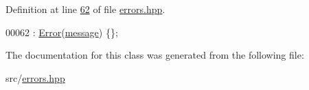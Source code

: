 Definition at line \hyperlink{errors_8hpp_source_l00062}{62} of file \hyperlink{errors_8hpp_source}{errors.\+hpp}.


\begin{DoxyCode}
00062 : \hyperlink{classError_accd611f3ddae0828adeb6ca251113ffd}{Error}(\hyperlink{classError_aa4713ef3ee9c3c0da43a54b01949510d}{message}) \{\};
\end{DoxyCode}


The documentation for this class was generated from the following file\+:\begin{DoxyCompactItemize}
\item 
src/\hyperlink{errors_8hpp}{errors.\+hpp}\end{DoxyCompactItemize}
